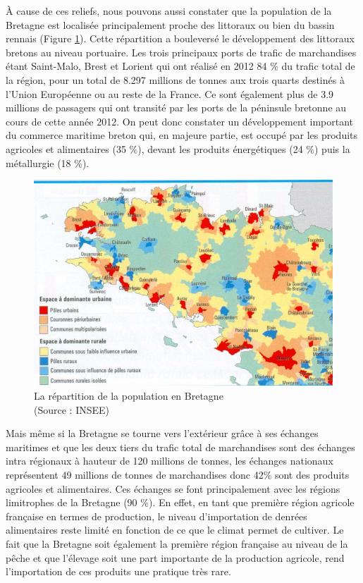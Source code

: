 \documentclass[a4paper,12pt]{report}
\begin{document}
			À cause de ces reliefs, nous pouvons aussi constater que la population de la Bretagne est localisée principalement proche des littoraux ou bien du bassin rennais (Figure \ref{DensitePopulationBretagne}). Cette répartition a bouleversé le développement des littoraux bretons au niveau portuaire. Les trois principaux ports de trafic de marchandises étant Saint-Malo, Brest et Lorient qui ont réalisé en 2012 84 \% du trafic total de la région, pour un total de 8.297 millions de tonnes aux trois quarts destinés à l’Union Européenne ou au reste de la France. Ce sont également plus de 3.9 millions de passagers qui ont transité par les ports de la péninsule bretonne au cours de cette année 2012\cite{CommerceMaritimeBretagne}. On peut donc constater un développement important du commerce maritime breton qui, en majeure partie, est occupé par les produits agricoles et alimentaires (35 \%), devant les produits énergétiques (24 \%) puis la métallurgie (18 \%).
			
			\begin{figure}[!h]
			\centering
			\includegraphics[scale=3.25]{Illustrations/DensitePopulationBretagne.jpg}
			\caption{La répartition de la population en Bretagne\\(Source : INSEE)}
			\label{DensitePopulationBretagne}
			\end{figure}						
			
			Mais même si la Bretagne se tourne vers l’extérieur grâce à ses échanges maritimes et que les deux tiers du trafic total de marchandises sont des échanges intra régionaux à hauteur de 120 millions de tonnes, les échanges nationaux représentent 49 millions de tonnes de marchandises donc 42\% sont des produits agricoles et alimentaires\cite{InfrastructureConnecterBretagneMondeCCI}. Ces échanges se font principalement avec les régions limitrophes de la Bretagne (90 \%). En effet, en tant que première région agricole française en termes de production, le niveau d’importation de denrées alimentaires reste limité en fonction de ce que le climat permet de cultiver. Le fait que la Bretagne soit également la première région française au niveau de la pêche et que l’élevage soit une part importante de la production agricole, rend l’importation de ces produits une pratique très rare.
			
\end{document}
